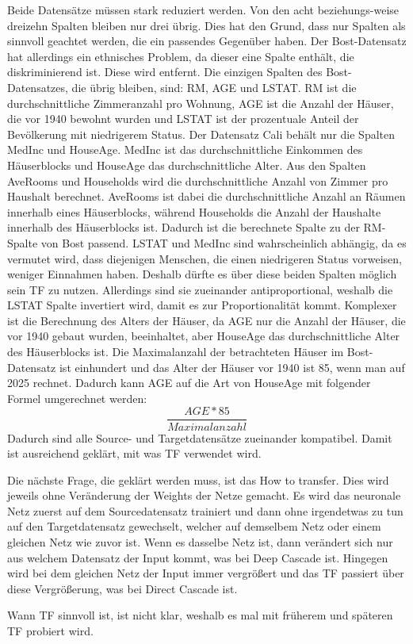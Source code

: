 Beide Datensätze müssen stark reduziert werden. Von den acht beziehungs-weise dreizehn Spalten bleiben nur drei übrig. Dies hat den Grund, dass 
nur Spalten als sinnvoll geachtet werden, die ein passendes Gegenüber haben. Der Bost-Datensatz hat allerdings ein ethnisches Problem, da 
dieser eine Spalte enthält, die diskriminierend ist. Diese wird entfernt. 
Die einzigen Spalten des Bost-Datensatzes, die übrig bleiben, sind: RM, AGE und LSTAT. RM ist die durchschnittliche Zimmeranzahl pro Wohnung, AGE 
ist die Anzahl der Häuser, die vor 1940 bewohnt wurden und LSTAT ist der prozentuale Anteil der Bevölkerung mit niedrigerem Status. 
Der Datensatz Cali behält nur die Spalten MedInc und HouseAge. MedInc ist das durchschnittliche Einkommen des Häuserblocks und HouseAge das 
durchschnittliche Alter. Aus den Spalten AveRooms und Households wird die durchschnittliche Anzahl von Zimmer pro Haushalt berechnet. AveRooms 
ist dabei die durchschnittliche Anzahl an Räumen innerhalb eines Häuserblocks, während Households die Anzahl der Haushalte innerhalb des 
Häuserblocks ist. Dadurch ist die berechnete Spalte zu der RM-Spalte von Bost passend. 
LSTAT und MedInc sind wahrscheinlich abhängig, da es vermutet wird, dass diejenigen Menschen, die einen niedrigeren Status vorweisen, weniger 
Einnahmen haben. Deshalb dürfte es über diese beiden Spalten möglich sein TF zu nutzen. Allerdings sind sie zueinander antiproportional, 
weshalb die LSTAT Spalte invertiert wird, damit es zur Proportionalität kommt. Komplexer ist die Berechnung des Alters der Häuser, da 
AGE nur die Anzahl der Häuser, die vor 1940 gebaut wurden, beeinhaltet, aber HouseAge das durchschnittliche Alter des Häuserblocks ist. 
Die Maximalanzahl der betrachteten Häuser im Bost-Datensatz ist einhundert und das Alter der Häuser vor 1940 ist 85, wenn man auf 2025 rechnet. 
Dadurch kann AGE auf die Art von HouseAge mit folgender Formel umgerechnet werden: 
\begin{equation}
    \frac{AGE * 85}{Maximalanzahl}
\end{equation}
Dadurch sind alle Source- und Targetdatensätze zueinander kompatibel. Damit ist ausreichend geklärt, mit was TF verwendet wird. 

Die nächste Frage, die geklärt werden muss, ist das How to transfer. Dies wird jeweils ohne Veränderung der Weights der Netze gemacht. 
Es wird das neuronale Netz zuerst auf dem Sourcedatensatz trainiert und dann ohne irgendetwas zu tun auf den Targetdatensatz gewechselt, 
welcher auf demselbem Netz oder einem gleichen Netz wie zuvor ist. Wenn es dasselbe Netz ist, dann verändert sich nur aus welchem 
Datensatz der Input kommt, was bei Deep Cascade ist. Hingegen wird bei dem gleichen Netz der Input immer vergrößert und das TF passiert über 
diese Vergrößerung, was bei Direct Cascade ist. 

Wann TF sinnvoll ist, ist nicht klar, weshalb es mal mit früherem und späteren TF probiert wird. 

